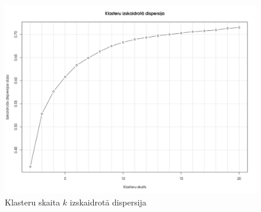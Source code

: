 \documentclass{ludis}
\begin{document}
\begin{figure}
  \centering
  \includegraphics[scale=0.5]{img/kmeans_elbow}
  \caption{Klasteru skaita $k$ izskaidrotā dispersija}
  \label{fig:kmeans_elbow}
\end{figure}


\end{document}
